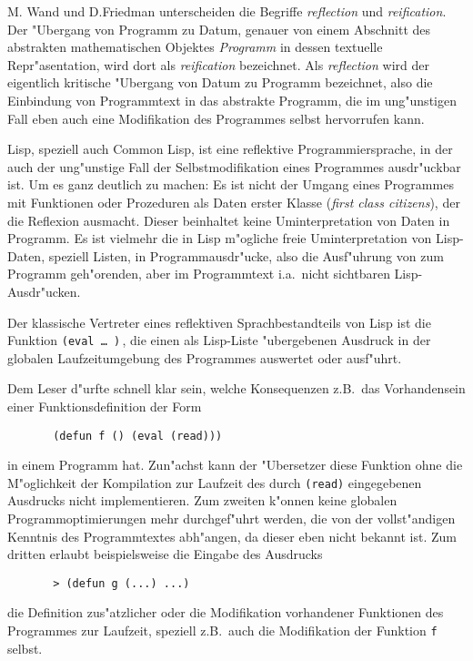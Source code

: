 M. Wand und D.Friedman \cite{Wand/Friedman86} unterscheiden die
Begriffe {\em reflection} und {\em reification}. Der "Ubergang von
Programm zu Datum, genauer von einem Abschnitt des abstrakten
mathematischen Objektes {\em Programm} in dessen textuelle
Repr"asentation, wird dort als {\em reification} bezeichnet. Als {\em
reflection} wird der eigentlich kritische "Ubergang von Datum zu
Programm bezeichnet, also die Einbindung von Programmtext in das
abstrakte Programm, die im ung"unstigen Fall eben auch eine
Modifikation des Programmes selbst hervorrufen kann.

Lisp, speziell auch Common Lisp, ist eine reflektive
Programmiersprache, in der auch der ung"unstige Fall der
Selbstmodifikation eines Programmes ausdr"uckbar ist. Um es ganz
deutlich zu machen: Es ist nicht der Umgang eines Programmes mit
Funktionen oder Prozeduren als Daten erster Klasse ({\em first class
citizens}), der die Reflexion ausmacht. Dieser beinhaltet keine
Uminterpretation von Daten in Programm. Es ist vielmehr die in Lisp
m"ogliche freie Uminterpretation von Lisp-Daten, speziell Listen, in
Programmausdr"ucke, also die Ausf"uhrung von zum Programm geh"orenden,
aber im Programmtext i.a.\ nicht sichtbaren Lisp-Ausdr"ucken.

Der klassische Vertreter eines reflektiven Sprachbestandteils von Lisp
ist die Funktion {\tt (eval\ \ldots\,)}\,, die einen als Lisp-Liste
"ubergebenen Ausdruck in der globalen Laufzeitumgebung des Programmes
auswertet oder ausf"uhrt.

Dem Leser d"urfte schnell klar sein, welche Konsequenzen z.B.\ das
Vorhandensein einer Funktionsdefinition der Form

\begin{verbatim}
       (defun f () (eval (read)))
\end{verbatim}

in einem Programm hat. Zun"achst kann der "Ubersetzer diese Funktion
ohne die M"oglichkeit der Kompilation zur Laufzeit des durch {\tt (read)}
eingegebenen Ausdrucks nicht implementieren. Zum zweiten
k"onnen keine globalen Programmoptimierungen mehr durchgef"uhrt
werden, die von der vollst"andigen Kenntnis des Programmtextes
abh"angen, da dieser eben nicht bekannt ist. Zum dritten erlaubt
beispielsweise die Eingabe des Ausdrucks

\begin{verbatim}
       > (defun g (...) ...)
\end{verbatim}

die Definition zus"atzlicher oder die Modifikation vorhandener
Funktionen des Programmes zur Laufzeit, speziell z.B.\ auch die
Modifikation der Funktion {\tt f} selbst.

